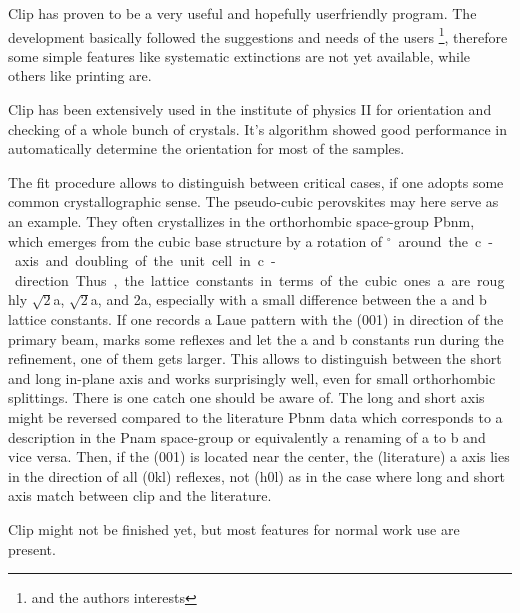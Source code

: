 Clip has proven to be a very useful and hopefully userfriendly
program. The development basically followed the suggestions and needs
of the users \footnote{and the authors interests}, therefore some
simple features like systematic extinctions are not yet available,
while others like printing are. 

Clip has been extensively used in the institute of physics II for
orientation and checking of a whole bunch of crystals. It's algorithm
showed good performance in automatically determine the orientation for
most of the samples.

The fit procedure allows to distinguish between critical cases, if one
adopts some common crystallographic sense. The pseudo-cubic
perovskites may here serve as an example. They often crystallizes in
the orthorhombic space-group Pbnm, which emerges from the cubic base
structure by a rotation of \unit[45]{$^\circ$} around the c-axis and
doubling of the unit cell in c-direction. Thus, the lattice constants
in terms of the cubic ones a are roughly $\sqrt{2}$a, $\sqrt{2}$a, and
2a, especially with a small difference between the a and b lattice
constants. If one records a Laue pattern with the \hkl(001) in
direction of the primary beam, marks some reflexes and let the a and b
constants run during the refinement, one of them gets larger. This
allows to distinguish between the short and long in-plane axis and
works surprisingly well, even for small orthorhombic splittings.
There is one catch one should be aware of.  The long and short axis
might be reversed compared to the literature Pbnm data which
corresponds to a description in the Pnam space-group or equivalently a
renaming of a to b and vice versa. Then, if the \hkl(001) is located
near the center, the (literature) a axis lies in the direction of all \hkl(0kl)
reflexes, not \hkl(h0l) as in the case where long and short axis match
between clip and the literature.

Clip might not be finished yet, but most features for normal work use
are present. 

 




